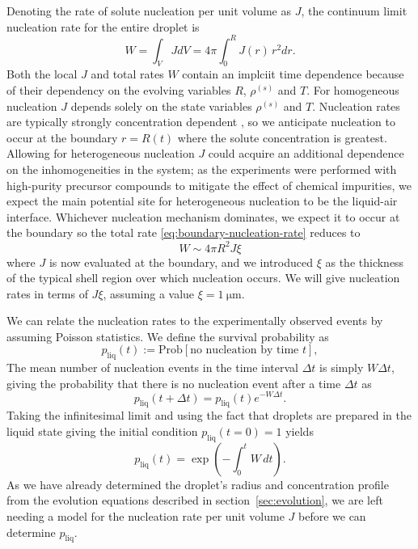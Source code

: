 \documentclass[11pt,twoside]{report}
\begin{document}
Denoting the rate of solute nucleation per unit volume as $J$, the continuum limit nucleation rate for the entire droplet is
\begin{equation}\label{eq:droplet-nucleation-rate}
  W
  =
  \int_V J dV
  =
  4\pi \int_0^R J(r) \, r^2 dr.
\end{equation}
Both the local $J$ and total rates $W$ contain an implciit time dependence because of their dependency on the evolving variables $R$, $\rho^{(s)}$ and $T$.
For homogeneous nucleation $J$ depends solely on the state variables $\rho^{(s)}$ and $T$.
Nucleation rates are typically strongly concentration dependent \cite{ValerianiJCP2005,DesarnaudJPCL2014,SearJPCM2007}, so we anticipate nucleation to occur at the boundary $r=R(t)$ where the solute concentration is greatest.
Allowing for heterogeneous nucleation $J$ could acquire an additional dependence on the inhomogeneities in the system; as the experiments were performed with high-purity precursor compounds to mitigate the effect of chemical impurities, we expect the main potential site for heterogeneous nucleation to be the liquid-air interface.
Whichever nucleation mechanism dominates, we expect it to occur at the boundary so the total rate \eqref{eq:boundary-nucleation-rate} reduces to
\begin{equation}\label{eq:boundary-nucleation-rate}
  W
  \sim
  4\pi R^2 J \xi
\end{equation}
where $J$ is now evaluated at the boundary, and we introduced $\xi$ as the thickness of the typical shell region over which nucleation occurs.
We will give nucleation rates in terms of $J \xi$, assuming a value $\xi = \SI{1}{\micro\metre}$.

We can relate the nucleation rates to the experimentally observed events by assuming Poisson statistics.
We define the survival probability as
\begin{equation*}
  p_\mathrm{liq}(t)
  :=
  \textrm{Prob}\left[ \textrm{no nucleation by time } t \right],
\end{equation*}
The mean number of nucleation events in the time interval $\Delta t$ is simply $W \Delta t$, giving the probability that there is no nucleation event after a time $\Delta t$ as
\begin{equation*}
  p_\mathrm{liq}(t + \Delta t) = p_\mathrm{liq}(t) e^{-W \Delta t}.
\end{equation*}
Taking the infinitesimal limit and using the fact that droplets are prepared in the liquid state giving the initial condition $p_\mathrm{liq}(t=0) = 1$ yields
\begin{equation}\label{eq:survival}
  p_\mathrm{liq}(t)
  =
  \exp{\left( -\int_0^t W \, dt \right)}.
\end{equation}
As we have already determined the droplet's radius and concentration profile from the evolution equations described in section\ \ref{sec:evolution}, we are left needing a model for the nucleation rate per unit volume $J$ before we can determine $p_\mathrm{liq}$.
\end{document}
